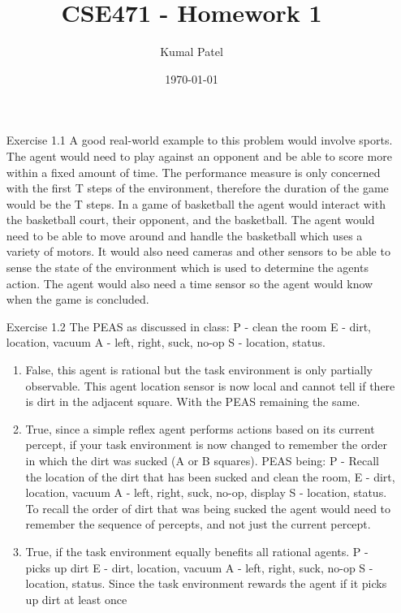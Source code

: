 \documentclass[letterpaper, 12pt]{article}
\title{CSE471 - Homework 1}
\author{Kumal Patel}
\date{\today}
\begin{document}
    
\maketitle

\begin{enumerate}
    \item[Exercise 1.1] 
        A good real-world example to this problem would involve sports. The agent would need to play against 
        an opponent and be able to score more within a fixed amount of time. The performance measure is
        only concerned with the first T steps of the environment, therefore the duration of the game 
        would be the T steps. In a game of basketball the agent would interact with the basketball court, 
        their opponent, and the basketball. The agent would need to be able to move around and handle the 
        basketball which uses a variety of motors. It would also need cameras and other sensors to be able
        to sense the state of the environment which is used to determine the agents action. The agent 
        would also need a time sensor so the agent would know when the game is concluded.
    \item[Exercise 1.2] 
    The PEAS as discussed in class:
        P - clean the room
        E - dirt, location, vacuum
        A - left, right, suck, no-op
        S - location, status.
    \begin{enumerate}
        \item 
        False, this agent is rational but the task environment is only partially observable. This agent 
        location sensor is now local and cannot tell if there is dirt in the adjacent square. 
        With the PEAS remaining the same.
        \item 
        True, since a simple reflex agent performs actions based on its current percept, if your task
        environment is now changed to remember the order in which the dirt was sucked (A or B squares). 
        PEAS being: P - Recall the location of the dirt that has been sucked and clean the room,
        E - dirt, location, vacuum A - left, right, suck, no-op, display S - location, status. To recall the order
        of dirt that was being sucked the agent would need to remember the sequence of percepts, and not 
        just the current percept.
        \item 
        True, if the task environment equally benefits all rational agents. P - picks up dirt E - dirt, location, vacuum
        A - left, right, suck, no-op S - location, status. Since the task environment rewards the agent if it picks up dirt at least once

\end{enumerate}
\end{enumerate}
\end{document}
